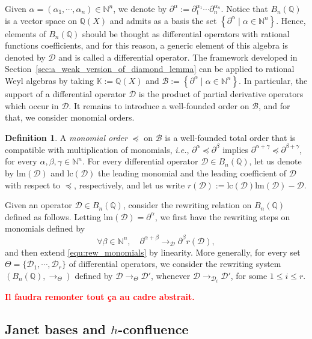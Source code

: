\documentclass[10pt]{easychair}
\theoremstyle{definition}
\newtheorem{definition}[theorem]{Definition}
\newcommand\ie{\emph{i.e.}}
\newcommand\todo[1]{{\bf\textcolor{red}{#1.}}}
\newcommand\diff[1]{\partial_{#1}}
\newcommand\D{\mathcal{D}}
\newcommand\lm{\text{lm}}
\newcommand\lc{\text{lc}}
\newcommand\basis{\mathscr{B}}
\newcommand\K{\mathbb{K}}
\newcommand\Q{\mathbb{Q}}
\newcommand\N{\mathbb{N}}
\newcommand\Weyl{B_n(\Q)}
\newcommand\rewTheta{\to_{\Theta}}
\begin{document}
Given $\alpha=(\alpha_1,\cdots,\alpha_n)\in\N^n$, we denote by 
$\partial^{\alpha}:=\diff{1}^{\alpha_1}\cdots\diff{n}^{\alpha_n}$. Notice
that $\Weyl$ is a vector space on $\Q(X)$ and admits as a basis the set
$\left\{\partial^\alpha\mid\alpha\in\N^n\right\}$. Hence, elements of
$\Weyl$ should be thought as differential operators with rational
functions coefficients, and for this reason, a generic element of this
algebra is denoted by $\D$ and is called a differential operator. The
framework developed in Section~\ref{sec:a_weak_version_of_diamond_lemma}
can be applied to rational Weyl algebras by taking $\K:=\Q(X)$ and
$\basis:=\left\{\partial^\alpha\mid\alpha\in\N^n\right\}$. In particular,
the support of a differential operator $\D$ is the product of partial
derivative operators which occur in $\D$. It remains to introduce a
well-founded order on $\basis$, and for that, we consider monomial
orders.

\begin{definition}
  A {\em monomial order} $\preceq$ on $\basis$ is a well-founded total
  order that is compatible with multiplication of monomials, \ie,
  $\partial^{\alpha}\preceq\partial^{\beta}$ implies 
  $\partial^{\alpha+\gamma}\preceq\partial^{\beta+\gamma}$, for every
  $\alpha,\beta,\gamma\in\N^n$. For every differential operator
  $\D\in\Weyl$, let us denote by $\lm(\D)$ and $\lc(\D)$ the leading
  monomial and the leading coefficient of $\D$ with respect to $\preceq$,
  respectively, and let us write $r(\D):=\lc(\D)\lm(\D)-\D$. 
\end{definition}

Given an operator $\D\in\Weyl$, consider the rewriting relation on
$\Weyl$ defined as follows. Letting $\lm(\D)=\partial^{\alpha}$, we first
have the rewriting steps on monomials defined by
\begin{equation}\label{equ:rew_monomials}
  \forall\beta\in\N^n,\quad\partial^{\alpha+\beta}
  \to_{\D}\partial^{\beta}r(\D),\end{equation}
and then extend \eqref{equ:rew_monomials} by linearity. More generally,
for every set $\Theta=\{\D_1,\cdots,\D_r\}$ of differential operators, we
consider the rewriting system $(\Weyl,\rewTheta)$ defined by
$\D\rewTheta\D'$, whenever $\D\to_{\D_i}\D'$, for some $1\leq i\leq r$.

\todo{Il faudra remonter tout ça au cadre abstrait}

\subsection{Janet bases and $h$-confluence}
\label{sec:Janet_bases_and_h_confluence}
\end{document}
